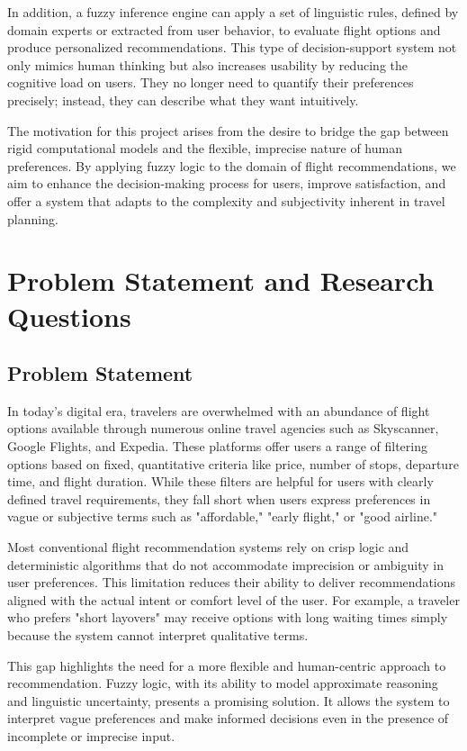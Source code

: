 \documentclass[a4paper]{article}
\begin{document}
In addition, a fuzzy inference engine can apply a set of linguistic rules, defined by domain experts or extracted from user behavior, to evaluate flight options and produce personalized recommendations. This type of decision-support system not only mimics human thinking but also increases usability by reducing the cognitive load on users. They no longer need to quantify their preferences precisely; instead, they can describe what they want intuitively.

The motivation for this project arises from the desire to bridge the gap between rigid computational models and the flexible, imprecise nature of human preferences. By applying fuzzy logic to the domain of flight recommendations, we aim to enhance the decision-making process for users, improve satisfaction, and offer a system that adapts to the complexity and subjectivity inherent in travel planning.

\section{Problem Statement and Research Questions}
\subsection{Problem Statement}
In today's digital era, travelers are overwhelmed with an abundance of flight options available through numerous online travel agencies such as Skyscanner, Google Flights, and Expedia. These platforms offer users a range of filtering options based on fixed, quantitative criteria like price, number of stops, departure time, and flight duration. While these filters are helpful for users with clearly defined travel requirements, they fall short when users express preferences in vague or subjective terms such as "affordable," "early flight," or "good airline."

Most conventional flight recommendation systems rely on crisp logic and deterministic algorithms that do not accommodate imprecision or ambiguity in user preferences. This limitation reduces their ability to deliver recommendations aligned with the actual intent or comfort level of the user. For example, a traveler who prefers "short layovers" may receive options with long waiting times simply because the system cannot interpret qualitative terms.

This gap highlights the need for a more flexible and human-centric approach to recommendation. Fuzzy logic, with its ability to model approximate reasoning and linguistic uncertainty, presents a promising solution. It allows the system to interpret vague preferences and make informed decisions even in the presence of incomplete or imprecise input.
\end{document}
